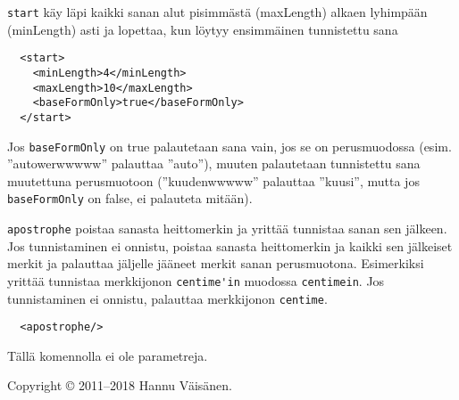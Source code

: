 \documentclass[12pt]{article}
\begin{document}


\bigskip
\verb=start= käy läpi kaikki sanan alut pisimmästä (maxLength) alkaen
lyhimpään (minLength) asti ja lopettaa, kun löytyy ensimmäinen
tunnistettu sana

\begin{verbatim}
  <start>
    <minLength>4</minLength>
    <maxLength>10</maxLength>
    <baseFormOnly>true</baseFormOnly>
  </start>
\end{verbatim}

Jos \verb=baseFormOnly= on true palautetaan sana vain, jos se on
perusmuodossa (esim. ''autowerwwwww'' palauttaa ''auto''), muuten
palautetaan tunnistettu sana muutettuna perusmuotoon (''kuudenwwwww''
palauttaa ''kuusi'', mutta jos \verb=baseFormOnly= on false, ei
palauteta mitään).




\bigskip

\verb=apostrophe= poistaa sanasta heittomerkin ja yrittää tunnistaa
sanan sen jälkeen. Jos tunnistaminen ei onnistu, poistaa sanasta
heittomerkin ja kaikki sen jälkeiset merkit ja palauttaa jäljelle
jääneet merkit sanan perusmuotona. Esimerkiksi yrittää tunnistaa
merkkijonon \verb=centime'in= muodossa \verb=centimein=. Jos
tunnistaminen ei onnistu, palauttaa merkkijonon \verb=centime=.


\begin{verbatim}
  <apostrophe/>
\end{verbatim}

Tällä komennolla ei ole parametreja.


\bigskip \noindent \noindent
Copyright © 2011--2018 Hannu Väisänen.
\end{document}
